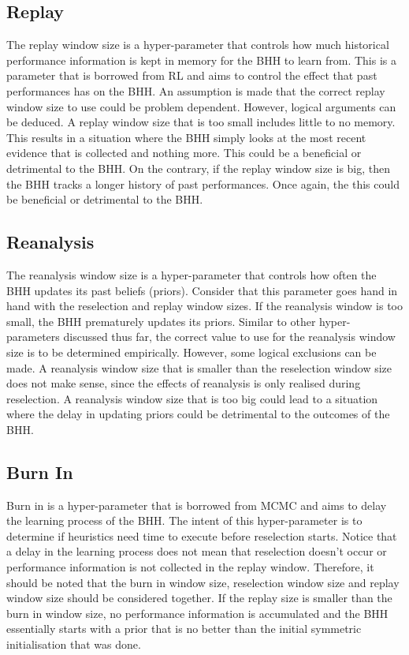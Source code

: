 \subsection{Replay}
\label{sec:bhh:hyper_parameters:replay}

The replay window size is a hyper-parameter that controls how much historical performance information is kept in memory for the \ac{BHH} to learn from. This is a parameter that is borrowed from \ac{RL} and aims to control the effect that past performances has on the \ac{BHH}. An assumption is made that the correct replay window size  to use could be problem dependent. However, logical arguments can be deduced. A replay window size that is too small includes little to no memory. This results in a situation where the \ac{BHH} simply looks at the most recent evidence that is collected and nothing more. This could be a beneficial or detrimental to the \ac{BHH}. On the contrary, if the replay window size is big, then the \ac{BHH} tracks a longer history of past performances. Once again, the this could be beneficial or detrimental to the \ac{BHH}.

\subsection{Reanalysis}
\label{sec:bhh:hyper_parameters:reanalysis}

The reanalysis window size is a hyper-parameter that controls how often the \ac{BHH} updates its past beliefs (priors). Consider that this parameter goes hand in hand with the reselection and replay window sizes. If the reanalysis window is too small, the \ac{BHH} prematurely updates its priors. Similar to other hyper-parameters discussed thus far, the correct value to use for the reanalysis window size is to be determined empirically. However, some logical exclusions can be made. A reanalysis window size that is smaller than the reselection window size does not make sense, since the effects of reanalysis is only realised during reselection. A reanalysis window size that is too big could lead to a situation where the delay in updating priors could be detrimental to the outcomes of the \ac{BHH}.

\subsection{Burn In}
\label{sec:bhh:hyper_parameters:burn_in}

Burn in is a hyper-parameter that is borrowed from \ac{MCMC} and aims to delay the learning process of the \ac{BHH}. The intent of this hyper-parameter is to determine if heuristics need time to execute before reselection starts. Notice that a delay in the learning process does not mean that reselection doesn't occur or performance information is not collected in the replay window. Therefore, it should be noted that the burn in window size, reselection window size and replay window size should be considered together. If the replay size is smaller than the burn in window size, no performance information is accumulated and the \ac{BHH} essentially starts with a prior that is no better than the initial symmetric initialisation that was done.

